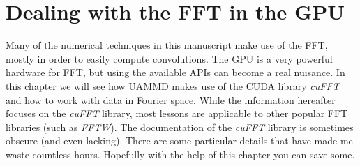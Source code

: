 \documentclass[ twoside,openright,titlepage,numbers=noenddot,%
headinclude,footinclude,cleardoublepage=empty,abstract=on,
BCOR=5mm,paper=b5,fontsize=11pt, dvipsnames
]{scrreprt}
\def\ucpp{uammd_cpp_lexer.py:UAMMDCppLexer -x}
\newcommand{\uammd}{\gls{UAMMD}\xspace}
\newcommand{\gpu}{\gls{GPU}\xspace}
\begin{document}
%    



\chapter{Dealing with the FFT in the GPU} \label{ch:appendixa}

Many of the numerical techniques in this manuscript make use of the \gls{FFT}, mostly in order to easily compute convolutions. The \gpu is a very powerful hardware for \gls{FFT}, but using the available \glspl{API} can become a real nuisance. In this chapter we will see how \uammd makes use of the CUDA library \emph{cuFFT}~\cite{cufft} and how to work with data in Fourier space. While the information hereafter focuses on the \emph{cuFFT} library, most lessons are applicable to other popular \gls{FFT} libraries (such as \emph{FFTW}).
The documentation of the \emph{cuFFT} library is sometimes obscure (and even lacking). There are some particular details that have made me waste countless hours. Hopefully with the help of this chapter you can save some.
\end{document}
